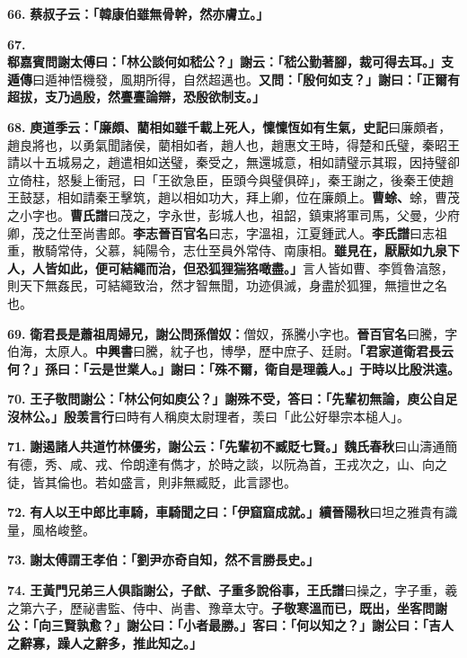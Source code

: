 \textbf{66.} \textbf{蔡叔子云：「韓康伯雖無骨幹，然亦膚立。」}

\textbf{67.} \textbf{郗嘉賓問謝太傅曰：「林公談何如嵇公？」謝云：「嵇公勤著腳，裁可得去耳。」}{\footnotesize \textbf{支遁傳}曰遁神悟機發，風期所得，自然超邁也。}\textbf{又問：「殷何如支？」謝曰：「正爾有超拔，支乃過殷，然亹亹論辯，恐殷欲制支。」}

\textbf{68.} \textbf{庾道季云：「廉頗、藺相如雖千載上死人，懍懍恆如有生氣，}{\footnotesize \textbf{史記}曰廉頗者，趙良將也，以勇氣聞諸侯，藺相如者，趙人也，趙惠文王時，得楚和氏璧，秦昭王請以十五城易之，趙遣相如送璧，秦受之，無還城意，相如請璧示其瑕，因持璧卻立倚柱，怒髮上衝冠，曰「王欲急臣，臣頭今與璧俱碎」，秦王謝之，後秦王使趙王鼓瑟，相如請秦王擊筑，趙以相如功大，拜上卿，位在廉頗上。}\textbf{曹蜍、}{\footnotesize 蜍，曹茂之小字也。\textbf{曹氏譜}曰茂之，字永世，彭城人也，祖韶，鎮東將軍司馬，父曼，少府卿，茂之仕至尚書郎。}\textbf{李志}{\footnotesize \textbf{晉百官名}曰志，字溫祖，江夏鍾武人。\textbf{李氏譜}曰志祖重，散騎常侍，父慕，純陽令，志仕至員外常侍、南康相。}\textbf{雖見在，厭厭如九泉下人，人皆如此，便可結繩而治，但恐狐狸猯狢噉盡。」}{\footnotesize 言人皆如曹、李質魯湻慤，則天下無姦民，可結繩致治，然才智無聞，功迹俱滅，身盡於狐狸，無擅世之名也。}

\textbf{69.} \textbf{衛君長是蕭祖周婦兄，謝公問孫僧奴：}{\footnotesize 僧奴，孫騰小字也。\textbf{晉百官名}曰騰，字伯海，太原人。\textbf{中興書}曰騰，紞子也，博學，歷中庶子、廷尉。}\textbf{「君家道衛君長云何？」孫曰：「云是世業人。」謝曰：「殊不爾，衛自是理義人。」于時以比殷洪遠。}

\textbf{70.} \textbf{王子敬問謝公：「林公何如庾公？」謝殊不受，答曰：「先輩初無論，庾公自足沒林公。」}{\footnotesize \textbf{殷羡言行}曰時有人稱庾太尉理者，羡曰「此公好舉宗本槌人」。}

\textbf{71.} \textbf{謝遏諸人共道竹林優劣，謝公云：「先輩初不臧貶七賢。」}{\footnotesize \textbf{魏氏春秋}曰山濤通簡有德，秀、咸、戎、伶朗達有儁才，於時之談，以阮為首，王戎次之，山、向之徒，皆其倫也。若如盛言，則非無臧貶，此言謬也。}

\textbf{72.} \textbf{有人以王中郎比車騎，車騎聞之曰：「伊窟窟成就。」}{\footnotesize \textbf{續晉陽秋}曰坦之雅貴有識量，風格峻整。}

\textbf{73.} \textbf{謝太傅謂王孝伯：「劉尹亦奇自知，然不言勝長史。」}

\textbf{74.} \textbf{王黃門兄弟三人俱詣謝公，子猷、子重多說俗事，}{\footnotesize \textbf{王氏譜}曰操之，字子重，羲之第六子，歷祕書監、侍中、尚書、豫章太守。}\textbf{子敬寒溫而已，既出，坐客問謝公：「向三賢孰愈？」謝公曰：「小者最勝。」客曰：「何以知之？」謝公曰：「吉人之辭寡，躁人之辭多，推此知之。」}


